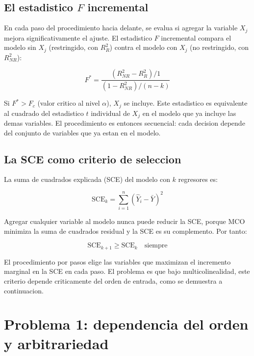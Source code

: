 \documentclass[12pt, letterpaper]{article}
\theoremstyle{remark}
\begin{document}
\subsection{El estadistico $F$ incremental}

En cada paso del procedimiento hacia delante, se evalua si agregar la
variable $X_j$ mejora significativamente el ajuste. El estadistico $F$
incremental compara el modelo sin $X_j$ (restringido, con $R^2_R$) contra
el modelo con $X_j$ (no restringido, con $R^2_{NR}$):

\begin{equation}
  F^* = \frac{(R^2_{NR} - R^2_R)/1}{(1 - R^2_{NR})/(n - k)}
  \label{eq:F_increm}
\end{equation}

Si $F^* > F_c$ (valor critico al nivel $\alpha$), $X_j$ se incluye. Este
estadistico es equivalente al cuadrado del estadistico $t$ individual de
$X_j$ en el modelo que ya incluye las demas variables. El procedimiento es
entonces secuencial: cada decision depende del conjunto de variables que
ya estan en el modelo.

\subsection{La SCE como criterio de seleccion}

La suma de cuadrados explicada (SCE) del modelo con $k$ regresores es:

\begin{equation}
  \text{SCE}_k = \sum_{i=1}^n (\hat Y_i - \bar Y)^2
  \label{eq:SCE}
\end{equation}

Agregar cualquier variable al modelo nunca puede reducir la SCE, porque
MCO minimiza la suma de cuadrados residual y la SCE es su complemento.
Por tanto:

\begin{equation}
  \text{SCE}_{k+1} \geq \text{SCE}_k \quad \text{siempre}
  \label{eq:monotonia_SCE}
\end{equation}

El procedimiento por pasos elige las variables que maximizan el incremento
marginal en la SCE en cada paso. El problema es que bajo multicolinealidad,
este criterio depende criticamente del orden de entrada, como se demuestra
a continuacion.

\section{Problema 1: dependencia del orden y arbitrariedad}
\end{document}
